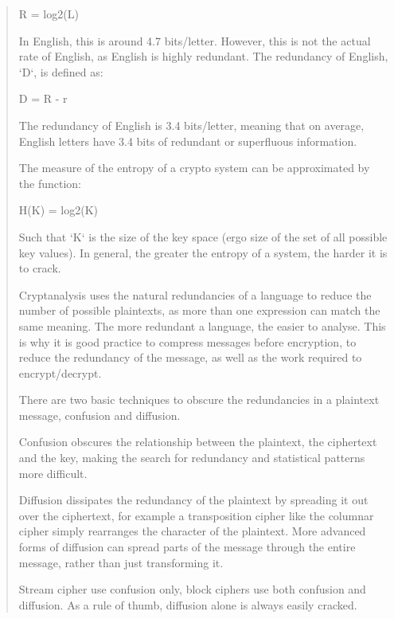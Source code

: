 \documentclass[12pt, a4paper, final]{report}
\begin{document}
\begin{quote}
    R = log2(L)

In English, this is around 4.7 bits/letter. However, this is not the actual
rate of English, as English is highly redundant. The redundancy of English, `D`, is defined as:

    D = R - r

The redundancy of English is 3.4 bits/letter, meaning that on average,
English letters have 3.4 bits of redundant or superfluous information.

The measure of the entropy of a crypto system can be approximated by the function:

    H(K) = log2(K)

Such that `K` is the size of the key space (ergo size of the set of all possible
key values). In general, the greater the entropy of a system, the harder it is to crack.

Cryptanalysis uses the natural redundancies of a language to reduce the number
of possible plaintexts, as more than one expression can match the same meaning. The more redundant a language, the easier to analyse. This is why it is good practice to compress messages before encryption, to reduce the redundancy of the message, as well as the work required to encrypt/decrypt.

There are two basic techniques to obscure the redundancies in a plaintext
message, confusion and diffusion.

Confusion obscures the relationship between the plaintext, the ciphertext and the
key, making the search for redundancy and statistical patterns more difficult.

Diffusion dissipates the redundancy of the plaintext by spreading it out over the
ciphertext, for example a transposition cipher like the columnar cipher simply rearranges the character of the plaintext. More advanced forms of diffusion can spread parts of the message through the entire message, rather than just transforming it.

Stream cipher use confusion only, block ciphers use both confusion and diffusion.
As a rule of thumb, diffusion alone is always easily cracked.
\end{quote}
\end{document}
